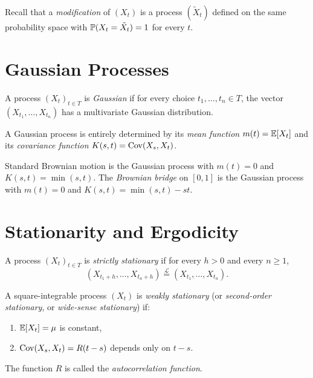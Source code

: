 \begin{remark}
Recall that a \emph{modification} of $(X_t)$ is a process $(\tilde{X}_t)$
defined on the same probability space with $\mathbb{P}(X_t = \tilde{X}_t) = 1$
for every $t$.
\end{remark}

\section{Gaussian Processes}

\begin{definition}
A process $(X_t)_{t \in T}$ is \emph{Gaussian} if for every choice
$t_1, \ldots, t_n \in T$, the vector $(X_{t_1}, \ldots, X_{t_n})$ has a
multivariate Gaussian distribution.

A Gaussian process is entirely determined by its \emph{mean function}
$m(t) = \mathbb{E}[X_t]$ and its \emph{covariance function}
$K(s, t) = \mathrm{Cov}(X_s, X_t)$.
\end{definition}

\begin{example}
Standard Brownian motion is the Gaussian process with $m(t) = 0$ and
$K(s, t) = \min(s, t)$. The \emph{Brownian bridge} on $[0, 1]$ is the Gaussian
process with $m(t) = 0$ and $K(s, t) = \min(s, t) - st$.
\end{example}

\section{Stationarity and Ergodicity}

\begin{definition}
A process $(X_t)_{t \in T}$ is \emph{strictly stationary} if for every $h > 0$
and every $n \geq 1$,
\[
  (X_{t_1+h}, \ldots, X_{t_n+h}) \overset{\mathcal{L}}{=} (X_{t_1}, \ldots, X_{t_n}).
\]
\end{definition}

\begin{definition}
A square-integrable process $(X_t)$ is \emph{weakly stationary} (or
\emph{second-order stationary}, or \emph{wide-sense stationary}) if:
\begin{enumerate}
  \item $\mathbb{E}[X_t] = \mu$ is constant,
  \item $\mathrm{Cov}(X_s, X_t) = R(t - s)$ depends only on $t - s$.
\end{enumerate}
The function $R$ is called the \emph{autocorrelation function}.
\end{definition}

